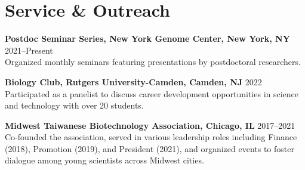 \documentclass[letterpaper,11pt]{cv}
\begin{document}
\section{Service \& Outreach}
\begin{entrylist}
    \item \textbf{Postdoc Seminar Series, New York Genome Center, New York, NY} \hfill 2021--Present \\
    {\small Organized monthly seminars featuring presentations by postdoctoral researchers.}
    \item \textbf{Biology Club, Rutgers University-Camden, Camden, NJ} \hfill 2022 \\
    {\small Participated as a panelist to discuss career development opportunities in science and technology with over 20 students.}
    \item \textbf{Midwest Taiwanese Biotechnology Association, Chicago, IL} \hfill 2017--2021 \\
    {\small Co-founded the association, served in various leadership roles including Finance (2018), Promotion (2019), and President (2021), and organized events to foster dialogue among young scientists across Midwest cities.}

\end{entrylist}
\end{document}
